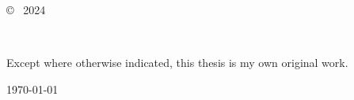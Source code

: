 \vspace*{14cm}
\begin{center}
  \makeatletter
  \copyright\ \@author{} 2024
  \makeatother
\end{center}
\noindent
\begin{center}
  \footnotesize{~} %
\end{center}
\noindent

\newpage


\vspace*{7cm}
\begin{center}
  Except where otherwise indicated, this thesis is my own original work.
\end{center}

\vspace*{4cm}

\hspace{8cm}\makeatletter\@author\makeatother\par
\hspace{8cm}\today
